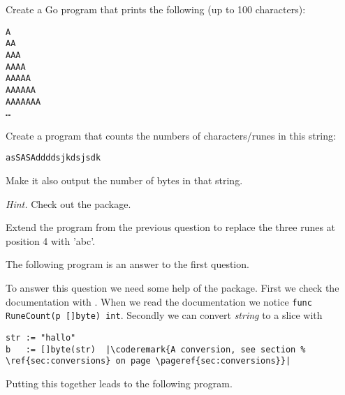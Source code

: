 \begin{Exercise}[title={Strings},difficulty=1]
\label{ex:strings}
\Question \label{ex:strings q1} Create a Go program that prints
the following (up to 100 characters):
\begin{alltt}
A
AA
AAA
AAAA
AAAAA
AAAAAA
AAAAAAA
\ldots
\end{alltt}


\Question \label{ex:strings q2} Create a program that counts
the numbers of characters/runes in this string:
\begin{alltt}
asSASA ddd dsjkdsjs dk
\end{alltt}
Make it also output the number of bytes in that string.
\begin{lbar}
\emph{Hint.} Check out the  package.
\end{lbar}

\Question \label{ex:string q3} Extend the program from
the previous question to replace the three runes at
position 4 with 'abc'.

\end{Exercise}

\begin{Answer}

\Question The following program is an answer to the first question.


\Question To answer this question we need some help of
the  package. First we check the documentation
with . When we read the documentation
we notice \lstinline{func RuneCount(p []byte) int}. Secondly
we can convert \emph{string} to a  slice with
\begin{lstlisting}
str := "hallo"
b   := []byte(str)  |\coderemark{A conversion, see section %
\ref{sec:conversions} on page \pageref{sec:conversions}}|
\end{lstlisting}

Putting this together leads to the following program.

\end{Answer}
